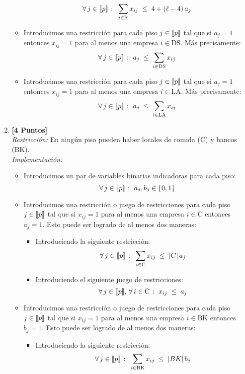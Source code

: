 \documentclass[ a4paper, twoside, 11pt]{article}
\begin{document}
\begin{problem}
\begin{enumerate}[label=\textbf{\alph*)}]
\begin{itemize}
\[
\forall \, j \in \llbracket p \rrbracket \; \colon \;
\sum_{ i \in \text{R} } x_{ij} \; \leq \; 4 + (\ell - 4) \, a_j
\]
\item Introducimos una restricci\'on para cada piso $j \in \llbracket p \rrbracket$ tal que si $a_j = 1$ entonces $x_{ij} = 1$ para al menos una empresa $i \in \text{DS}$. M\'as precisamente: 
\[
\forall \, j \in \llbracket p \rrbracket \; \colon \;
a_j \; \leq \; \sum_{i \in \text{DS}} x_{ij}
\]
\item Introducimos una restricci\'on para cada piso $j \in \llbracket p \rrbracket$ tal que si $a_j = 1$ entonces $x_{ij} = 1$ para al menos una empresa $i \in \text{LA}$. M\'as precisamente: 
\[
\forall \, j \in \llbracket p \rrbracket \; \colon \;
a_j \; \leq \; \sum_{i \in \text{LA}} x_{ij}
\]
\end{itemize}
\item \textbf{[4 Puntos]} \\[1ex]
\emph{Restricci\'on:} En ning\'un piso pueden haber locales de comida (C) y bancos (BK). \\[1ex]
\emph{Implementaci\'on:}
\begin{itemize}
\item Introducimos un par de variables binarias indicadoras para cada piso: 
\[
\forall \, j \in \llbracket p \rrbracket \; \colon \; a_j, b_j \in \{ 0, 1 \}
\]
\item Introducimos una restricci\'on o juego de restricciones para cada piso $j \in \llbracket p \rrbracket$ tal que si $x_{ij} = 1$ para al menos una empresa $i \in \text{C}$ entonces $a_j = 1$. Esto puede ser logrado de al menos dos maneras: 
\begin{itemize}
\item Introduciendo la siguiente restricci\'on: 
\[
\forall \, j \in \llbracket p \rrbracket \; \colon \;
\sum_{i \in \text{C}} x_{ij} \; \leq \; |C| \, a_j
\]
\item Introduciendo el siguiente juego de restricciones: 
\[
\forall \, j \in \llbracket p \rrbracket, \, \forall \, i \in \text{C} \; \colon \;
x_{ij} \; \leq \; a_j
\]
\end{itemize}
\item Introducimos una restricci\'on o juego de restricciones para cada piso $j \in \llbracket p \rrbracket$ tal que si $x_{ij} = 1$ para al menos una empresa $i \in \text{BK}$ entonces $b_j = 1$. Esto puede ser logrado de al menos dos maneras: 
\begin{itemize}
\item Introduciendo la siguiente restricci\'on: 
\[
\forall \, j \in \llbracket p \rrbracket \; \colon \;
\sum_{i \in \text{BK}} x_{ij} \; \leq \; |BK| \, b_j
\]
\end{itemize}
\end{itemize}
\end{enumerate}
\end{problem}
\end{document}
